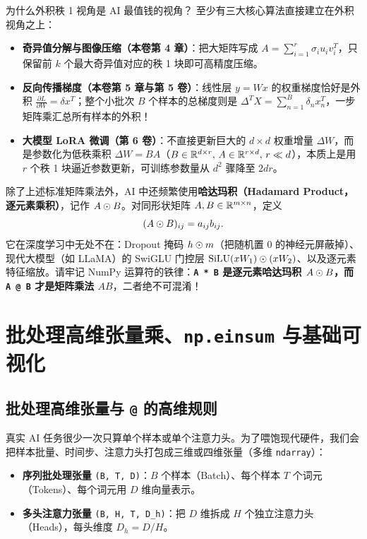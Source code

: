 \begin{insightBox}{为什么外积秩 1 视角是 AI 最值钱的视角？}
至少有三大核心算法直接建立在外积视角之上：
\begin{itemize}
  \item \textbf{奇异值分解与图像压缩（本卷第 4 章）}：把大矩阵写成 $A = \sum_{i=1}^r \sigma_i u_i v_i^T$，只保留前 $k$ 个最大奇异值对应的秩 1 块即可高精度压缩。
  \item \textbf{反向传播梯度（本卷第 5 章与第 5 卷）}：线性层 $y = Wx$ 的权重梯度恰好是外积 $\frac{\partial L}{\partial W} = \delta x^T$；整个小批次 $B$ 个样本的总梯度则是 $\Delta^T X = \sum_{n=1}^B \delta_n x_n^T$，一步矩阵乘汇总所有样本的外积！
  \item \textbf{大模型 LoRA 微调（第 6 卷）}：不直接更新巨大的 $d \times d$ 权重增量 $\Delta W$，而是参数化为低秩乘积 $\Delta W = B A$（$B \in \mathbb{R}^{d \times r},\, A \in \mathbb{R}^{r \times d},\, r \ll d$），本质上是用 $r$ 个秩 1 块逼近参数更新，可训练参数量从 $d^2$ 骤降至 $2dr$。
\end{itemize}
\end{insightBox}

除了上述标准矩阵乘法外，AI 中还频繁使用\textbf{哈达玛积（Hadamard Product，逐元素乘积）}，记作 $A \odot B$。对同形状矩阵 $A, B \in \mathbb{R}^{m \times n}$，定义
\[
(A \odot B)_{ij} = a_{ij} b_{ij}.
\]
它在深度学习中无处不在：Dropout 掩码 $h \odot m$（把随机置 0 的神经元屏蔽掉）、现代大模型（如 LLaMA）的 SwiGLU 门控层 $\operatorname{SiLU}(x W_1) \odot (x W_2)$、以及逐元素特征缩放。请牢记 NumPy 运算符的铁律：\textbf{\texttt{A * B} 是逐元素哈达玛积 $A \odot B$，而 \texttt{A @ B} 才是矩阵乘法 $AB$}，二者绝不可混淆！

\section{批处理高维张量乘、\texttt{np.einsum} 与基础可视化}\label{sec:batch-einsum}

\subsection{批处理高维张量与 \texttt{@} 的高维规则}

真实 AI 任务很少一次只算单个样本或单个注意力头。为了喂饱现代硬件，我们会把样本批量、时间步、注意力头打包成三维或四维张量（多维 \texttt{ndarray}）：
\begin{itemize}
  \item \textbf{序列批处理张量} \texttt{(B, T, D)}：$B$ 个样本（Batch）、每个样本 $T$ 个词元（Tokens）、每个词元用 $D$ 维向量表示。
  \item \textbf{多头注意力张量} \texttt{(B, H, T, D\_h)}：把 $D$ 维拆成 $H$ 个独立注意力头（Heads），每头维度 $D_h = D/H$。
\end{itemize}

